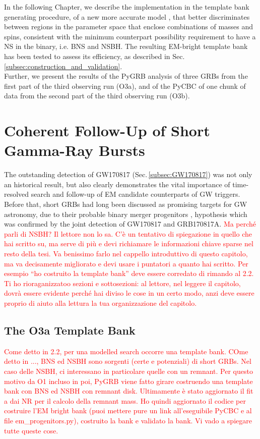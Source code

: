 \documentclass[binding=0.6cm, LaM]{sapthesis}
\newcommand{\fpg}[1]{\textcolor{red}{#1} }
\begin{document}
	In the following Chapter, we describe the implementation in the template bank generating procedure,
	of a new more accurate model \cite{205}, that better discriminates between regions in the parameter space 
	that enclose combinations of masses and spins,
        consistent with the minimum counterpart possibility requirement to have a NS in the binary, i.e. BNS and NSBH.
	The resulting EM-bright template bank has been tested to assess its efficiency, as described in Sec.\,\ref{subsec:construction_and_validation}. \\
	Further, we present the results of the PyGRB analysis of three GRBs from the first part of the third  observing run (O3a), and 
	of the PyCBC of one chunk of data from the second part of the third observing run (O3b).

\section{Coherent Follow-Up of Short Gamma-Ray Bursts}
	The outstanding detection of GW170817 (Sec.\,\ref{subsec:GW170817}) was not only an historical result, 
	but also clearly demonstrates the vital importance of time-resolved search and follow-up of EM candidate counterparts of GW triggers. 
	Before that, short GRBs had long been discussed as promising targets for GW astronomy,
	due to their probable binary merger progenitors \cite{162}, 
	hypothesis which was confirmed by the joint detection of GW170817  and GRB170817A.
\fpg{Ma perch\'e parli di NSBH?  Il lettore non lo sa.  C'\`e un tentativo di spiegazione in quello che hai scritto su, ma serve di pi\`u e devi richiamare le informazioni chiave sparse nel resto della tesi.  Va benissimo farlo nel cappello introduttivo di questo capitolo, ma va decisamente migliorato e devi usare i puntatori a quanto hai scritto.  Per esempio ``ho costruito la template bank'' deve essere corredato di rimando al 2.2.   Ti ho rioraganizzatoo sezioni e sottosezioni: al lettore, nel leggere il capitolo, dovr\`a essere evidente perch\'e hai diviso le cose in un certo modo, anzi deve essere proprio di aiuto alla lettura la tua organizzazione del capitolo.}

\subsection{The O3a Template Bank}
\fpg{Come detto in 2.2, per una modelled search occorre una template bank.  COme detto in ..., BNS ed NSBH sono sorgenti (certe e potenziali) di short GRBs.  Nel caso delle NSBH, ci interessano in particolare quelle con un remnant.  Per questo motivo da O1 incluso in poi, PyGRB viene fatto girare costruendo una template bank con BNS ed NSBH con remnant disk.  Ultimamente \`e stato aggiornato il fit a dai NR per il calcolo della remnant mass.  Ho quindi aggiornato il codice per costruire l'EM bright bank (puoi mettere pure un link all'eseguibile PyCBC e al file em\_progenitors.py), costruito la bank e validato la bank.  Vi vado a spiegare tutte queste cose.}
\end{document}
